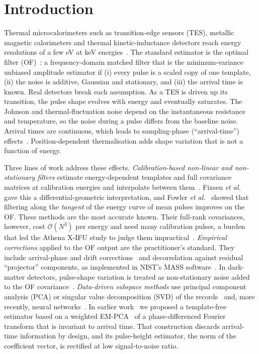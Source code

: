 \documentclass[aps,prapplied,reprint,superscriptaddress,longbibliography,nofootinbib]{revtex4-2}
\theoremstyle{remark}
\begin{document}
\section{Introduction}
\label{sec:intro}

Thermal microcalorimeters such as transition-edge sensors (TES), metallic magnetic
calorimeters and thermal kinetic-inductance detectors reach energy resolutions of a
few eV at keV energies~\cite{Moseley1984,IrwinHilton2005}. The standard estimator is
the optimal filter (OF)~\cite{Szymkowiak1993,Fowler2016practice}: a frequency-domain
matched filter that is the minimum-variance unbiased amplitude estimator if (i) every
pulse is a scaled copy of one template, (ii) the noise is additive, Gaussian and
stationary, and (iii) the arrival time is known. Real detectors break each
assumption. As a TES is driven up its transition, the pulse shape evolves with
energy and eventually saturates. The Johnson and thermal-fluctuation noise depend on
the instantaneous resistance and temperature, so the noise during a pulse differs
from the baseline noise. Arrival times are continuous, which leads to sampling-phase
(``arrival-time'') effects~\cite{Fowler2016practice}. Position-dependent
thermalisation adds shape variation that is not a function of energy.

Three lines of work address these effects. \emph{Calibration-based non-linear and
non-stationary filters} estimate energy-dependent templates and full covariance
matrices at calibration energies and interpolate between
them~\cite{Fixsen2002,Fixsen2004,Shank2014,Fixsen2014,Peille2016}. Fixsen
\emph{et al.}~\cite{Fixsen2014} gave this a differential-geometric interpretation, and
Fowler \emph{et al.}~\cite{Fowler2017tangent} showed that filtering along the
\emph{tangent} of the energy curve of mean pulses improves on the OF. These methods
are the most accurate known. Their full-rank covariances, however, cost
$\mathcal O(N^3)$ per energy and need many calibration pulses, a burden that led
the Athena X-IFU study to judge them impractical~\cite{Peille2016}. \emph{Empirical
corrections} applied to the OF output are the practitioner's standard. They include
arrival-phase and drift corrections~\cite{Fowler2016practice} and decorrelation
against residual ``projector'' components, as implemented in NIST's MASS
software~\cite{mass}. In dark-matter detectors, pulse-shape variation is treated as
non-stationary noise added to the OF covariance~\cite{CDMSlite2018,Albakry2026}.
\emph{Data-driven subspace methods} use principal component analysis (PCA) or
singular value decomposition (SVD) of the
records~\cite{deVries2016,Yan2016,Busch2016,Alpert2016,Fowler2018nonlinear,Fowler2020rpca,Miller2021,Yu2019}
and, more recently, neural networks~\cite{Ichinohe2022,Albakry2026}. In earlier
work~\cite{Yu2019} we proposed a template-free estimator based on a weighted
EM-PCA~\cite{Roweis1998,Bailey2012} of a phase-differenced Fourier transform that is
invariant to arrival time. That construction discards arrival-time information by
design, and its pulse-height estimator, the norm of the coefficient vector, is
rectified at low signal-to-noise ratio.
\end{document}
